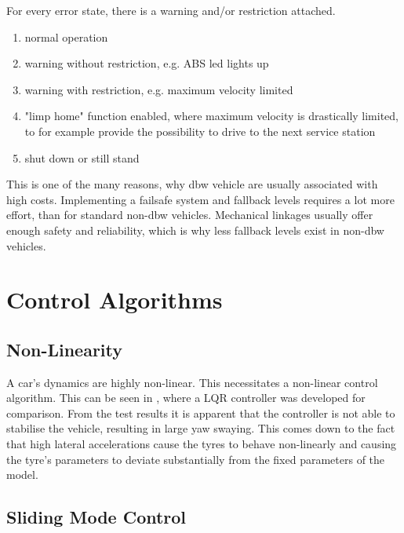 \documentclass[conference]{IEEEtran}
\begin{document}
For every error state, there is a warning and/or restriction attached. 
\begin{enumerate}
	\item normal operation
	\item warning without restriction, e.g. ABS led lights up
	\item warning with restriction, e.g. maximum velocity limited
	\item "limp home" function enabled, where maximum velocity is drastically limited, to for example provide the possibility to drive to the next service station
	\item shut down or still stand
\end{enumerate}

This is one of the many reasons, why dbw vehicle are usually associated with high costs. Implementing a failsafe system and fallback levels requires a lot more effort, than for standard non-dbw vehicles. Mechanical linkages usually offer enough safety and reliability, which is why less fallback levels exist in non-dbw vehicles. 



\section{Control Algorithms}
\subsection{Non-Linearity}

A car's dynamics are highly non-linear. This necessitates a non-linear control algorithm. This can be seen in \cite{vandersande}, where a LQR controller was developed for comparison. From the test results it is apparent that the controller is not able to stabilise the vehicle, resulting in large yaw swaying. This comes down to the fact that high lateral accelerations cause the tyres to behave non-linearly and causing the tyre's parameters to deviate substantially from the fixed parameters of the model.


\subsection{Sliding Mode Control}
\end{document}
